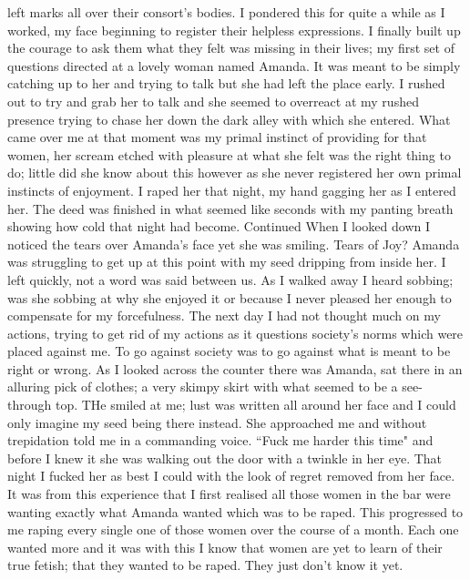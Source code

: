 left marks all over their consort's bodies. I pondered this for quite a while as 
I worked, my face beginning to register their helpless expressions. I finally 
built up the courage to ask them what they felt was missing in their lives; my 
first set of questions directed at a lovely woman named Amanda. It was meant to 
be simply catching up to her and trying to talk but she had left the place
early. I rushed out to try and grab her to talk and she seemed to overreact at 
my rushed presence trying to chase her down the dark alley with which she 
entered. What came over me at that moment was my primal instinct of providing 
for that women, her scream etched with pleasure at what she felt was the right 
thing to do; little did she know about this however as she never registered her 
own primal instincts of enjoyment. I raped her that night, my hand gagging her 
as I entered her. The deed was finished in what seemed like seconds with my 
panting breath showing how cold that night had become. Continued
When I looked down I noticed the tears over Amanda's face yet she was smiling. 
Tears of Joy? Amanda was struggling to get up at this point with my seed 
dripping from inside her. I left quickly, not a word was said between us. As I 
walked away I heard sobbing; was she sobbing at why she enjoyed it or because I 
never pleased her enough to compensate for my forcefulness. The next day I had 
not thought much on my actions, trying to get rid of my actions as it questions
society's norms which were placed against me. To go against society was to go 
against what is meant to be right or wrong. As I looked across the counter there 
was Amanda, sat there in an alluring pick of clothes; a very skimpy skirt with 
what seemed to be a see-through top. THe smiled at me; lust was written all 
around her face and I could only imagine my seed being there instead. She 
approached me and without trepidation told me in a commanding voice. ``Fuck me
harder this time" and before I knew it she was walking out the door with a 
twinkle in her eye. That night I fucked her as best I could with the look of 
regret removed from her face. It was from this experience that I first realised 
all those women in the bar were wanting exactly what Amanda wanted which was to 
be raped. This progressed to me raping every single one of those women over the 
course of a month. Each one wanted more and it was with this I know that women 
are yet to learn of their true fetish; that they wanted to be raped. They just 
don't know it yet.



